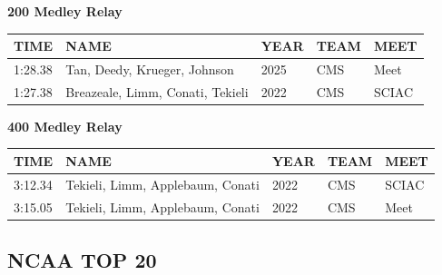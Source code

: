 \begin{table}[H]
\centering
\begin{minipage}[t]{0.6\textwidth}
\centering
\textbf{200 Medley Relay}\\[0.1cm]
\begin{tabular}{@{}p{1.8cm}p{2.8cm}p{1.2cm}p{1.4cm}p{1.4cm}@{}}
\hline
    \textbf{TIME} & \textbf{NAME} & \textbf{YEAR} & \textbf{TEAM} & \textbf{MEET} \\
\hline
    1:28.38 & Tan, Deedy, Krueger, Johnson & 2025 & CMS & Meet \\
    1:27.38 & Breazeale, Limm, Conati, Tekieli & 2022 & CMS & SCIAC \\
\hline
\end{tabular}
\end{minipage}
\end{table}

\begin{table}[H]
\centering
\begin{minipage}[t]{0.6\textwidth}
\centering
\textbf{400 Medley Relay}\\[0.1cm]
\begin{tabular}{@{}p{1.8cm}p{2.8cm}p{1.2cm}p{1.4cm}p{1.4cm}@{}}
\hline
    \textbf{TIME} & \textbf{NAME} & \textbf{YEAR} & \textbf{TEAM} & \textbf{MEET} \\
\hline
    3:12.34 & Tekieli, Limm, Applebaum, Conati & 2022 & CMS & SCIAC \\
    3:15.05 & Tekieli, Limm, Applebaum, Conati & 2022 & CMS & Meet \\
\hline
\end{tabular}
\end{minipage}
\end{table}


\newpage



\subsection{NCAA TOP 20}

